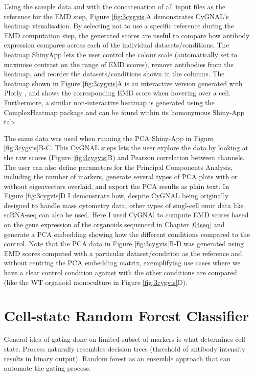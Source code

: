 Using the sample data and with the concatenation of all input files as the reference for the EMD step, Figure \ref{fig:3cygvis}A demonstrates CyGNAL's heatmap visualisation. By selecting not to use a specific reference during the EMD computation step, the generated scores are useful to compare how antibody expression compares across each of the individual datasets/conditions. The heatmap ShinyApp lets the user control the colour scale (automatically set to maximise contrast on the range of EMD scores), remove antibodies from the heatmap, and reorder the datasets/conditions shown in the columns. The heatmap shown in Figure \ref{fig:3cygvis}A is an interactive version generated with Plotly \cite{plotly_technologies_inc_collaborative_2015}, and shows the corresponding EMD score when hovering over a cell. Furthermore, a similar non-interactive heatmap is generated using the ComplexHeatmap \cite{gu_complexheatmap_2021} package and can be found within its homonymous Shiny-App tab.

The same data was used when running the PCA Shiny-App in Figure \ref{fig:3cygvis}B-C. This CyGNAL steps lets the user explore the data by looking at the raw scores (Figure \ref{fig:3cygvis}B) and Pearson correlation between channels. The user can also define parameters for the Principal Components Analysis, including the number of markers, generate several types of PCA plots with or without eigenvectors overlaid, and export the PCA results as plain text. In Figure \ref{fig:3cygvis}D I demonstrate how, despite CyGNAL being originally designed to handle mass cytometry data, other types of singl-cell omic data like scRNA-seq can also be used. Here I used CyGNAl to compute EMD scores based on the gene expression of the organoids sequenced in Chapter \ref{04seq} and generate a PCA embedding showing how the different conditions compared to the control.
Note that the PCA data in Figure \ref{fig:3cygvis}B-D was generated using EMD scores computed with a particular dataset/condition as the reference and without centring the PCA embedding matrix, exemplifying use cases where we have a clear control condition against with the other conditions are compared (like the WT organoid monoculture in Figure \ref{fig:3cygvis}D).


\section{Cell-state Random Forest Classifier}

General idea of gating done on limited subset of markers is what determines cell state. Process naturally resembles decision trees (threshold of antibody intensity results in binary output). Random forest as an ensemble approach that can automate the gating process.

